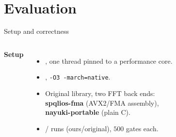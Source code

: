 \documentclass[aspectratio=169,11pt]{beamer}
\newcommand{\muted}[1]{{\color{cGray}#1}}
\begin{document}
\section{Evaluation}

\begin{frame}{Setup and correctness}
\begin{columns}[T,onlytextwidth]
\textbf{Setup}
\begin{itemize}
  \item \CPU, one thread pinned to a performance core.
  \item \Compiler, \texttt{-O3 -march=native}.
  \item Original library, two FFT back ends:\\
        \textbf{spqlios-fma} \muted{(AVX2/FMA assembly)},\\
        \textbf{nayuki-portable} \muted{(plain C)}.
  \item \OurRuns{}/\OrigRuns{} runs (ours/original), $500$ gates each.
\end{itemize}
\end{columns}
\end{frame}
\end{document}
